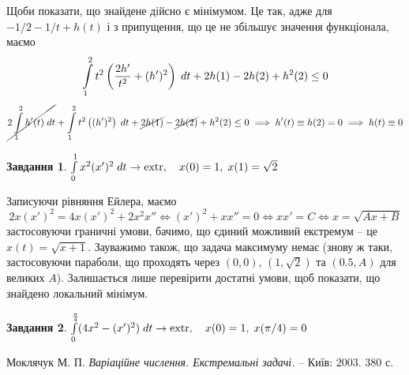 \documentclass[12pt]{article} %
\newtheorem{prob}{Завдання}
\newcommand{\dt}{\;dt}
\let\oldint\int
\renewcommand{\int}{\oldint\limits}
\newcommand{\extr}{\mbox{\normalfont extr}}
\begin{document}
Щоби показати, що знайдене дійсно є мінімумом. Це так, адже для $-1/2-1/t+h(t)$ і з припущення, що це не збільшує значення функціонала, маємо
\[\int_1^2t^2\mybra{\frac{2h'}{t^2}+(h')^2}\dt+2h(1)-2h(2)+h^2(2)\leq0\]
\[\cancel{2\int_1^2h'(t)\dt}+\int_1^2t^2\mybra{(h')^2}\dt+\cancel{2h(1)}-\cancel{2h(2)}+h^2(2)\leq0\implies h'(t)\equiv h(2)=0\implies h(t)\equiv0\]
\begin{prob}{}\; $\int_0^1x^2(x')^2\dt\to\extr,\quad x(0)=1,\;x(1)=\sqrt{2}$\end{prob}
	Записуючи рівняння Ейлера, маємо
	\[2x(x')^2=4x(x')^2+2x^2x''\iff (x')^2+xx''=0\iff xx'=C\iff x=\sqrt{Ax+B}\]
	застосовуючи граничні умови, бачимо, що єдиний можливий екстремум -- це $x(t)=\sqrt{x+1}$. Зауважимо також, що задача
	максимуму немає (знову ж таки, застосовуючи параболи, що проходять через $(0,0)$, $(1,\sqrt{2})$ та $(0.5,A)$ для великих $A$). Залишається
	лише перевірити достатні умови, щоб показати, що знайдено локальний мінімум.
	\begin{enumerate}
	\end{enumerate}
\begin{prob}{}\; $\int_0^{\frac{\pi}{4}}(4x^2-(x')^2)\dt\to\extr,\quad x(0)=1,\;x(\pi/4)=0$
\end{prob}
\begin{thebibliography}{9}
Моклячук М. П. \emph{Варіаційне числення. Екстремальні задачі.} --
Київ: 2003. 380 с.
\end{thebibliography}
\end{document}
